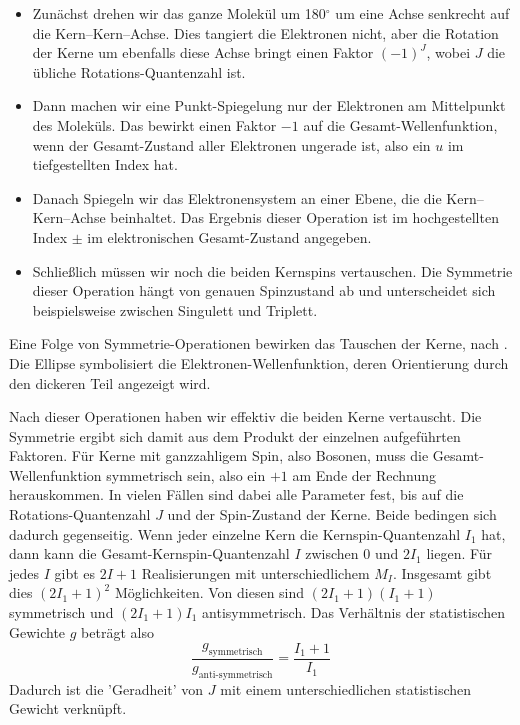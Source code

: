 \begin{itemize}\setlength{\itemsep}{0pt}
\item Zunächst drehen wir das ganze Molekül um 180$^\circ$ um eine Achse senkrecht auf die Kern--Kern--Achse. Dies tangiert die Elektronen nicht, aber die Rotation der Kerne um ebenfalls diese Achse bringt einen Faktor $(-1)^J$, wobei $J$ die übliche Rotations-Quantenzahl ist.

\item Dann machen wir eine Punkt-Spiegelung nur der Elektronen am Mittelpunkt des Moleküls. Das bewirkt einen Faktor $-1$ auf die Gesamt-Wellenfunktion, wenn der Gesamt-Zustand aller Elektronen ungerade ist, also ein $u$ im tiefgestellten Index hat.

\item Danach Spiegeln wir das Elektronensystem an einer Ebene, die die Kern--Kern--Achse beinhaltet. Das Ergebnis dieser Operation ist im hochgestellten Index $\pm$ im elektronischen Gesamt-Zustand angegeben.

\item Schließlich müssen wir noch die beiden Kernspins vertauschen. Die Symmetrie dieser Operation hängt von genauen Spinzustand ab und unterscheidet sich beispielsweise zwischen Singulett und Triplett.
\end{itemize}

\begin{marginfigure}[-50mm]
\caption{Eine Folge von Symmetrie-Operationen bewirken das Tauschen der Kerne, nach \cite{HertelSchulz-2}. Die Ellipse symbolisiert die Elektronen-Wellenfunktion, deren Orientierung durch den dickeren Teil angezeigt wird.}
\end{marginfigure}

 
 
Nach dieser Operationen haben wir effektiv die beiden Kerne vertauscht. Die Symmetrie ergibt sich damit aus dem Produkt der einzelnen aufgeführten Faktoren. Für Kerne mit ganzzahligem Spin, also Bosonen, muss die Gesamt-Wellenfunktion symmetrisch sein, also ein $+1$ am Ende der Rechnung herauskommen. In vielen Fällen sind dabei alle Parameter fest, bis auf die Rotations-Quantenzahl $J$ und der Spin-Zustand der Kerne. Beide bedingen sich dadurch gegenseitig. Wenn jeder einzelne Kern die Kernspin-Quantenzahl $I_1$ hat, dann kann die Gesamt-Kernspin-Quantenzahl $I$ zwischen $0$ und $2 I_1$ liegen. Für jedes $I$ gibt es $2 I +1$ Realisierungen mit unterschiedlichem $M_I$. Insgesamt gibt dies $(2 I_1 + 1)^2$ Möglichkeiten. Von diesen sind $(2 I_1 +1)( I_1 +1)$ symmetrisch und $(2 I_1 +1) I_1$ antisymmetrisch. Das Verhältnis der statistischen Gewichte $g$ beträgt also
\begin{equation}
 \frac{g_\text{symmetrisch}}{g_\text{anti-symmetrisch}} = \frac{I_1 + 1}{I_1}
\end{equation}
Dadurch ist die  'Geradheit' von $J$ mit einem unterschiedlichen statistischen Gewicht verknüpft.




